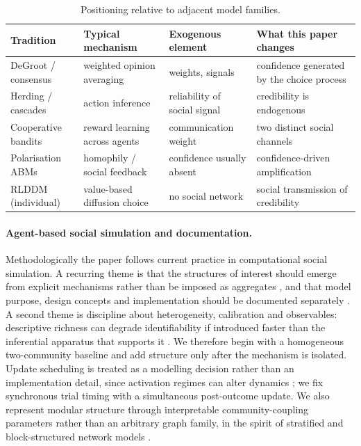 \documentclass[11pt]{article}
\newcommand{\1}{\mathbf{1}}
\begin{document}
\begin{table}[t]\centering\small
\caption{Positioning relative to adjacent model families.}
\label{tab:comparison}
\begin{tabular}{p{3.1cm}p{3.2cm}p{2.9cm}p{3.4cm}}
\toprule
Tradition & Typical mechanism & Exogenous element & What this paper changes \\
\midrule
DeGroot / consensus & weighted opinion averaging & weights, signals & confidence generated by the choice process \\
Herding / cascades & action inference & reliability of social signal & credibility is endogenous \\
Cooperative bandits & reward learning across agents & communication weight & two distinct social channels \\
Polarisation ABMs & homophily / social feedback & confidence usually absent & confidence-driven amplification \\
RLDDM (individual) & value-based diffusion choice & no social network & social transmission of credibility \\
\bottomrule
\end{tabular}
\end{table}

\paragraph{Agent-based social simulation and documentation.}
Methodologically the paper follows current practice in computational social
simulation. A recurring theme is that the structures of interest should emerge
from explicit mechanisms rather than be imposed as aggregates
\citep{StoneKunasekaranPoulosMacIntyreHeslop2026}, and that model purpose,
design concepts and implementation should be documented separately
\citep{GrimmBergerDeAngelisPolhillGiskeRailsback2010,Grimm2020,MullerBohmeFrankGrabnitzMuller2013}.
A second theme is discipline about heterogeneity, calibration and observables:
descriptive richness can degrade identifiability if introduced faster than the
inferential apparatus that supports it
\citep{OlukanWardMallesonGe2026,WindrumFagioloMoneta2007,Carrella2021,McCullochGeWardHeppenstallPolhillMalleson2022,PolhillHareBauermannAnzolaPalmerSaltAntosz2021}.
We therefore begin with a homogeneous two-community baseline and add structure
only after the mechanism is isolated. Update scheduling is treated as a
modelling decision rather than an implementation detail, since activation
regimes can alter dynamics
\citep{Axtell2000,CaronLormierHumphryBohanHawesThorbek2008,WeimerMillerHillHodson2019};
we fix synchronous trial timing with a simultaneous post-outcome update. We
also represent modular structure through interpretable community-coupling
parameters rather than an arbitrary graph family, in the spirit of stratified
and block-structured network models
\citep{GoncalvesFierensRego2026,LeeWilkinson2019,Peixoto2014}.
\end{document}
